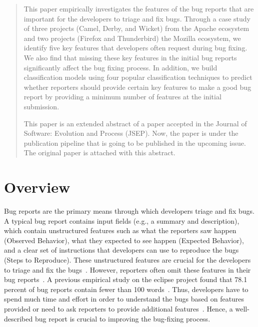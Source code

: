 \documentclass[conference]{IEEEtran}
\begin{document}
\begin{abstract}
This paper empirically investigates the features of the bug reports that are important for the developers to triage and fix bugs. Through a case study of three projects (Camel, Derby, and Wicket) from the Apache ecosystem and two projects (Firefox and Thunderbird) the Mozilla ecosystem, we identify five key features that developers often request during bug fixing. We also find that missing these key features in the initial bug reports significantly affect the bug fixing process. In addition, we build classification models using four popular classification techniques to predict whether reporters should provide certain key features to make a good bug report by providing a minimum number of features at the initial submission.

This paper is an extended abstract of a paper accepted in the Journal of Software: Evolution and Process (JSEP). Now, the paper is under the publication pipeline that is going to be published in the upcoming issue. The original paper is attached with this abstract.
\end{abstract}


\section{Overview}
Bug reports are the primary means through which developers triage and fix bugs. A typical bug report contains input fields (e.g., a summary and description), which contain unstructured features such as what the reporters saw happen (Observed Behavior), what they expected to see happen (Expected Behavior), and a clear set of instructions that developers can use to reproduce the bugs (Steps to Reproduce). These unstructured features are crucial for the developers to triage and fix the bugs~\cite{Bettenburg:2008}. However, reporters often omit these features in their bug reports~\cite{Breu:2010, Davies:2014, Aranda:2009, Sasso:2016}. A previous empirical study on the eclipse project found that 78.1 percent of bug reports contain fewer than 100 words~\cite{Zhang:2017}. Thus, developers have to spend much time and effort in order to understand the bugs based on features provided or need to ask reporters to provide additional features~\cite{Breu:2010, Karim:2017, ErfaniJoorabchi:2014}. Hence, a well-described bug report is crucial to improving the bug-fixing process.
\end{document}
